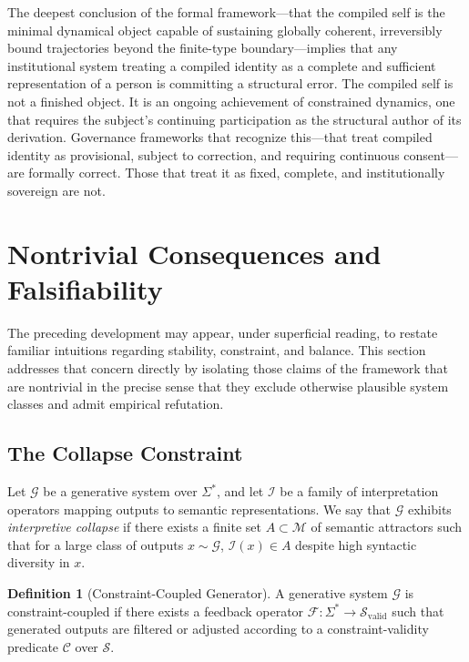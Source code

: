 \documentclass[12pt, a4paper]{article}
\theoremstyle{plain}
\theoremstyle{definition}
\newtheorem{definition}[theorem]{Definition}
\theoremstyle{remark}
\begin{document}
The deepest conclusion of the formal framework---that the compiled self is the minimal dynamical object capable of sustaining globally coherent, irreversibly bound trajectories beyond the finite-type boundary---implies that any institutional system treating a compiled identity as a complete and sufficient representation of a person is committing a structural error. The compiled self is not a finished object. It is an ongoing achievement of constrained dynamics, one that requires the subject's continuing participation as the structural author of its derivation. Governance frameworks that recognize this---that treat compiled identity as provisional, subject to correction, and requiring continuous consent---are formally correct. Those that treat it as fixed, complete, and institutionally sovereign are not.

\section{Nontrivial Consequences and Falsifiability}

The preceding development may appear, under superficial reading, to restate familiar intuitions regarding stability, constraint, and balance. This section addresses that concern directly by isolating those claims of the framework that are nontrivial in the precise sense that they exclude otherwise plausible system classes and admit empirical refutation.

\subsection{The Collapse Constraint}

Let $\mathcal{G}$ be a generative system over $\Sigma^*$, and let $\mathcal{I}$ be a family of interpretation operators mapping outputs to semantic representations. We say that $\mathcal{G}$ exhibits \emph{interpretive collapse} if there exists a finite set $A \subset \mathcal{M}$ of semantic attractors such that for a large class of outputs $x \sim \mathcal{G}$, $\mathcal{I}(x) \in A$ despite high syntactic diversity in $x$.

\begin{definition}[Constraint-Coupled Generator]
A generative system $\mathcal{G}$ is constraint-coupled if there exists a feedback operator $\mathcal{F} : \Sigma^* \to \mathcal{S}_{\mathrm{valid}}$ such that generated outputs are filtered or adjusted according to a constraint-validity predicate $\mathcal{C}$ over $\mathcal{S}$.
\end{definition}
\end{document}

